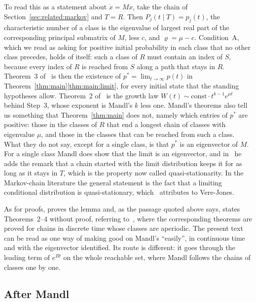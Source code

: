 \documentclass[11pt]{article}
\theoremstyle{definition}
\theoremstyle{remark}
\begin{document}
To read this as a statement about $\dot{x} = Mx$, take the chain of
Section~\ref{sec:related:markov} and $T = R$. Then $P_j(t \mid T) = p_j(t)$, the characteristic
number of a class is the eigenvalue of largest real part of the corresponding principal
submatrix of $M$, less $c$, and $\varrho = \mu - c$. Condition~A, which we read as asking for
positive initial probability in each class that no other class precedes, holds of itself: such a
class of $R$ must contain an index of $S$, because every index of $R$ is reached from $S$ along
a path that stays in $R$. Theorem~3 of~\cite{Mandl60} is then the existence of
$p^* = \lim_{t\to\infty} p(t)$ in Theorem~\ref{thm:main}\ref{thm:main:limit}, for every initial
state that the standing hypotheses allow. Theorem~2 of~\cite{Mandl60} is the growth law
$W(t) \sim \mathrm{const} \cdot t^{k-1} e^{\mu t}$ behind Step~3, whose exponent is Mandl's $k$
less one. Mandl's theorems also tell us something that Theorem~\ref{thm:main} does not, namely
which entries of $p^*$ are positive: those in the classes of $R$ that end a longest chain of
classes with eigenvalue $\mu$, and those in the classes that can be reached from such a class.
What they do not say, except for a single class, is that $p^*$ is an eigenvector of $M$. For a
single class Mandl does show that the limit is an eigenvector, and in~\cite{Mandl59} he adds the
remark that a chain started with the limit distribution keeps it for as long as it stays in $T$,
which is the property now called quasi-stationarity. In the Markov-chain literature the general
statement is the fact that a limiting conditional distribution is quasi-stationary,
which~\cite{vDP13} attributes to Vere-Jones.

As for proofs, \cite{Mandl60} proves the lemma and, as the passage quoted above says, states
Theorems~2--4 without proof, referring to~\cite{Mandl59}, where the corresponding theorems are
proved for chains in discrete time whose classes are aperiodic. The present text can be read as
one way of making good on Mandl's ``easily'', in continuous time and with the eigenvector
identified. Its route is different: it goes through the leading term of $e^{Bt}$ on the whole
reachable set, where Mandl follows the chains of classes one by one.

\subsection{After Mandl}\label{sec:related:after}
\end{document}
